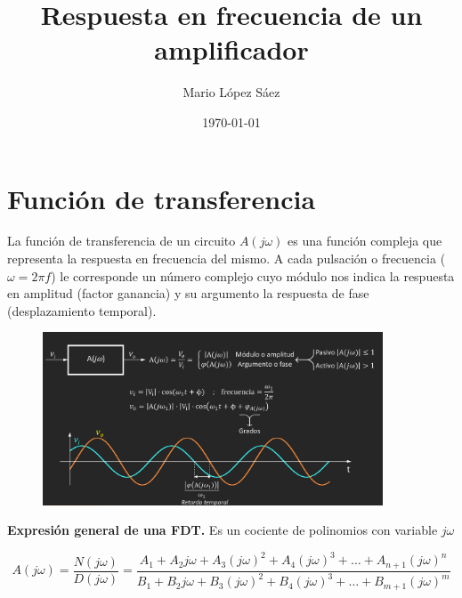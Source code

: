 \documentclass{article}
\begin{document}
\title{Respuesta en frecuencia de un amplificador}
\author{Mario López Sáez}
\date{\today}
\maketitle

\begin{center}

\end{center}

\section{Función de transferencia}
La función de transferencia de un circuito \( A(j\omega) \) es una función compleja que representa la respuesta en frecuencia del mismo. A cada pulsación o frecuencia (\(\omega = 2\pi f\)) le corresponde un número complejo cuyo módulo nos indica la respuesta en amplitud (factor ganancia) y su argumento la respuesta de fase (desplazamiento temporal).

\begin{figure}[h!]
    \centering
    \includegraphics[width=0.9\textwidth]{fig1.jpg} 
\end{figure}
\begin{center}
\textbf{Expresión general de una FDT.} Es un cociente de polinomios con variable $j \omega$
\end{center}
\[ A(j\omega) = \frac{N(j\omega)}{D(j\omega)} = \frac{A_1 + A_2 j\omega + A_3 (j\omega)^2 + A_4 (j\omega)^3 + \ldots + A_{n+1} (j\omega)^n}{B_1 + B_2 j\omega + B_3 (j\omega)^2 + B_4 (j\omega)^3 + \ldots + B_{m+1} (j\omega)^m} \]
\end{document}
